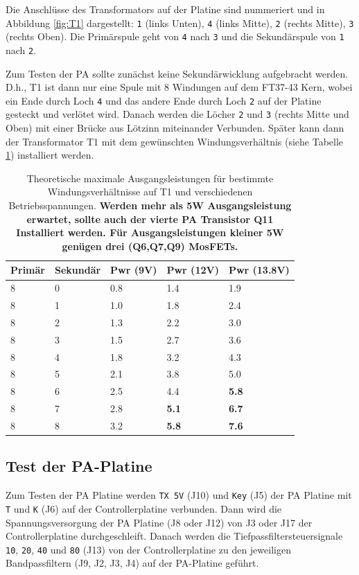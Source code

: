 \documentclass[10pt, a4paper]{paper}
\newcommand{\warn}[1]{\textbf{#1}}
\newcommand{\con}[1]{\texttt{#1}}
\begin{document}
Die Anschlüsse des Transformators auf der Platine sind nummeriert und in Abbildung \ref{fig:T1} dargestellt: \con{1} (links Unten), \con{4} (links Mitte), \con{2} (rechts Mitte), \con{3} (rechts Oben). Die Primärspule geht von \con{4} nach \con{3} und die Sekundärspule von \con{1} nach \con{2}. 

Zum Testen der PA sollte zunächst keine Sekundärwicklung aufgebracht werden. D.h., T1 ist dann nur eine Spule mit 8 Windungen auf dem FT37-43 Kern, wobei ein Ende durch Loch \con{4} und das andere Ende durch Loch \con{2} auf der Platine gesteckt und verlötet wird. Danach werden die Löcher \con{2} und \con{3} (rechts Mitte und Oben) mit einer Brücke aus Lötzinn miteinander Verbunden. Später kann dann der Transformator T1 mit dem gewünschten Windungsverhältnis (siehe Tabelle \ref{tab:Pout}) installiert werden.

\begin{table}[!ht]
 \centering
 \begin{tabular}{|l|l|l|l|l|} \hline
  Primär & Sekundär & Pwr (9V) & Pwr (12V) & Pwr (13.8V) \\ \hline
  8 & 0 & 0.8 & 1.4 & 1.9 \\
  8 & 1 & 1.0 & 1.8 & 2.4 \\
  8 & 2 & 1.3 & 2.2 & 3.0 \\
  8 & 3 & 1.5 & 2.7 & 3.6 \\
  8 & 4 & 1.8 & 3.2 & 4.3 \\
  8 & 5 & 2.1 & 3.8 & 5.0 \\
  8 & 6 & 2.5 & 4.4 & \warn{5.8} \\
  8 & 7 & 2.8 & \warn{5.1} & \warn{6.7} \\
  8 & 8 & 3.2 & \warn{5.8} & \warn{7.6} \\ \hline 
 \end{tabular}
 \caption{Theoretische maximale Ausgangsleistungen für bestimmte Windungsverhältnisse auf T1 und verschiedenen Betriebsspannungen. \warn{Werden mehr als 5W Ausgangsleistung erwartet, sollte auch der vierte PA Transistor Q11 Installiert werden. Für Ausgangsleistungen kleiner 5W genügen drei (Q6,Q7,Q9) MosFETs.}} \label{tab:Pout} 
\end{table}


\subsection{Test der PA-Platine}
Zum Testen der PA Platine werden \con{TX 5V} (J10) und \con{Key} (J5) der PA Platine mit \con{T} und \con{K} (J6) auf der Controllerplatine verbunden. Dann wird die Spannungsversorgung der PA Platine (J8 oder J12) von J3 oder J17 der Controllerplatine durchgeschleift. Danach werden die Tiefpassfiltersteuersignale \con{10}, \con{20}, \con{40} und \con{80} (J13) von der Controllerplatine zu den jeweiligen Bandpassfiltern (J9, J2, J3, J4) auf der PA-Platine geführt.
\end{document}

